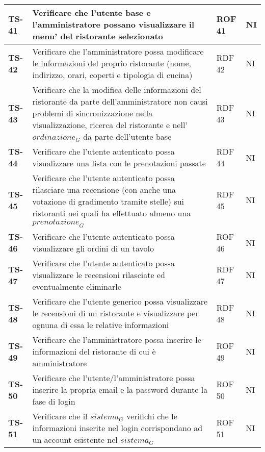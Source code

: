 \begin{longtable}{|>{\centering\arraybackslash}p{1.5cm}|p{12cm}|p{2cm}|p{1cm}|}
  \hline
  \rowcolor{gray!10}
  \textbf{TS-41} & Verificare che l'utente base e l'amministratore possano visualizzare il menu' del ristorante selezionato & ROF 41 & NI \\ 
  \hline
  \rowcolor{gray!10}
  \textbf{TS-42} & Verificare che l'amministratore possa modificare le informazioni del proprio ristorante (nome, indirizzo, orari, coperti e tipologia di cucina) & RDF 42 & NI \\
  \hline
  \rowcolor{gray!10}
  \textbf{TS-43} & Verificare che la modifica delle informazioni del ristorante da parte dell'amministratore non causi problemi di sincronizzazione nella visualizzazione, ricerca del ristorante e nell'$\textit{ordinazione}_G$ da parte dell'utente base & RDF 43 & NI \\ 
  \hline
  \rowcolor{gray!10}
  \textbf{TS-44} & Verificare che l’utente autenticato possa visualizzare una lista con le
prenotazioni passate& RDF 44 & NI \\ 
  \hline
  \rowcolor{gray!10}
  \textbf{TS-45} & Verificare che l'utente autenticato possa rilasciare una recensione (con anche una votazione di gradimento tramite stelle) sui ristoranti nei quali ha effettuato almeno una $\textit{prenotazione}_G$ & RDF 45 & NI \\ 
  \hline
  \rowcolor{gray!10}
  \textbf{TS-46} & Verificare che l'utente autenticato possa visualizzare gli ordini di un tavolo & ROF 46 & NI \\ 
  \hline
  \rowcolor{gray!10}
  \textbf{TS-47} & Verificare che l'utente autenticato possa visualizzare le recensioni rilasciate ed eventualmente eliminarle & RDF 47 & NI \\ 
  \hline
  \rowcolor{gray!10}
  \textbf{TS-48} & Verificare che l'utente generico possa visualizzare le recensioni di un ristorante e visualizzare per ognuna di essa le relative informazioni & RDF 48 & NI \\ 
  \hline
  \rowcolor{gray!10}
  \textbf{TS-49} & Verificare che l'amministratore possa inserire le informazioni del ristorante di cui è amministratore & ROF 49 & NI \\
  \hline
  \rowcolor{gray!10}
  \textbf{TS-50} & Verificare che l'utente/l'amministratore possa inserire la propria email e la password durante la fase di login & ROF 50 & NI \\ 
  \hline
  \rowcolor{gray!10}
  \textbf{TS-51} & Verificare che il $\textit{sistema}_G$ verifichi che le informazioni inserite nel login corrispondano ad un account esistente nel $\textit{sistema}_G$ & ROF 51 & NI \\ 

\end{longtable}
